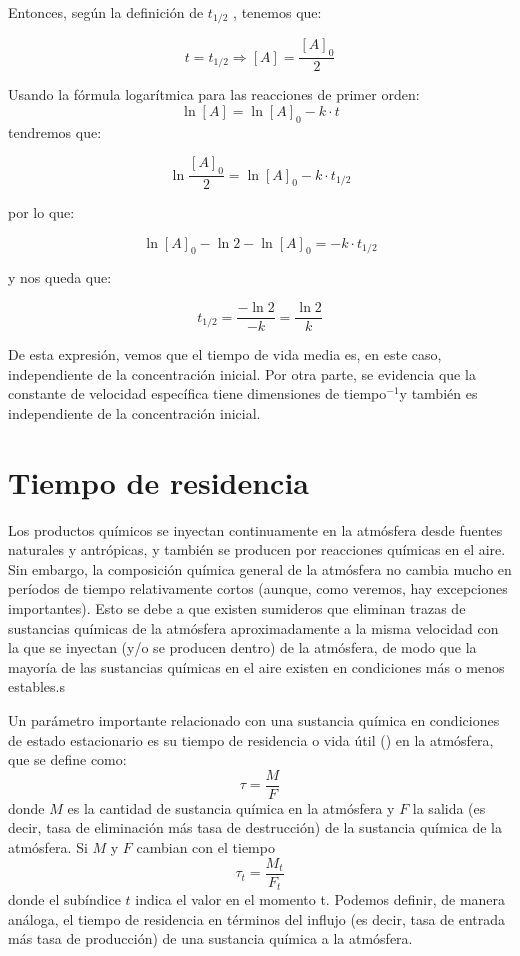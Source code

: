 Entonces, según la definición de  $t_{1/2}$ , tenemos que:

\begin{equation*}
t=t_{1/2} \Longrightarrow  [A]=\frac{[A]_0}{2}
\end{equation*}

Usando la fórmula logarítmica para las reacciones de primer orden:
\begin{equation*}
\ln[A]=\ln[A]_0-k\cdot t
\end{equation*}
tendremos que: 

$$\ln\frac{[A]_0}{2}=\ln[A]_0-k\cdot t_{1/2}$$

por lo que:

$$\ln[A]_0-\ln2-\ln[A]_0=-k\cdot t_{1/2}$$

y nos queda que:

$$t_{1/2}=\frac{-\ln2}{-k}=\frac{\ln2}{k}$$

De esta expresión, vemos que el tiempo de vida media es, en este caso, independiente de la concentración inicial. Por otra parte, se evidencia que la constante de velocidad específica tiene dimensiones de tiempo$^{-1}$y también es independiente de la concentración inicial.

\section{Tiempo de residencia}\label{tdres}
Los productos químicos se inyectan continuamente en la atmósfera desde fuentes naturales y antrópicas, y también se producen por reacciones químicas en el aire. Sin embargo, la composición química general de la atmósfera no cambia mucho en períodos de tiempo relativamente cortos (aunque, como veremos, hay excepciones importantes). Esto se debe a que existen sumideros que eliminan trazas de sustancias químicas de la atmósfera aproximadamente a la misma velocidad con la que se inyectan (y/o se producen dentro) de la atmósfera, de modo que la mayoría de las sustancias químicas en el aire existen en condiciones más o menos estables.s

Un parámetro importante relacionado con una sustancia química en condiciones de estado estacionario es su tiempo de residencia o vida útil () en la atmósfera, que se define como:
\begin{equation*}
\tau=\frac{M}{F}
\end{equation*}
donde $M$ es la cantidad de sustancia química en la atmósfera y $F$ la salida (es decir, tasa de eliminación más tasa de destrucción) de la sustancia química de la atmósfera. Si $M$ y $F$ cambian con el tiempo
\begin{equation*}
\tau_t=\frac{M_t}{F_t}
\end{equation*}
donde el subíndice $t$ indica el valor en el momento t. Podemos definir, de manera análoga, el tiempo de residencia en términos del influjo (es decir, tasa de entrada más tasa de producción) de una sustancia química a la atmósfera.

